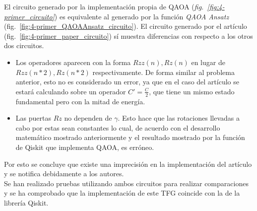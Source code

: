 El circuito generado por la implementación propia de QAOA (\textit{fig.~\ref{fig:4-primer_circuito}}) es equivalente al generado por la función \textit{QAOA Ansatz} (fig.~\ref{fig:4-primer_QAOAAnsatz_circuito}).
El circuito generado por el artículo (fig.~\ref{fig:4-primer_paper_circuito}) sí muestra diferencias con respecto a los otros dos circuitos.

\begin{itemize}
\item Los operadores aparecen con la forma $Rzz(n), Rz(n)$ en lugar de $Rzz(n*2), Rz(n*2)$ respectivamente.
  De forma similar al problema anterior, esto no es considerado un error, ya que en el caso del artículo\cite{multi-objective_routing_optimization} se estará calculando sobre un operador $C' = \frac{C}{2}$, que tiene un mismo estado fundamental pero con la mitad de energía.

\item Las puertas $Rz$ no dependen de $\gamma$.
  Esto hace que las rotaciones llevadas a cabo por estas sean constantes lo cual, de acuerdo con el desarrollo matemático mostrado anteriormente y el resultado mostrado por la función de Qiskit que implementa QAOA, es erróneo.
  
\end{itemize}

Por esto se concluye que existe una imprecisión en la implementación del artículo y se notifica debidamente a los autores.
\\
Se han realizado pruebas utilizando ambos circuitos para realizar comparaciones y se ha comprobado que la implementación de este TFG coincide con la de la librería Qiskit.


